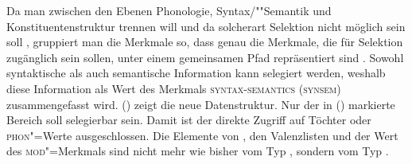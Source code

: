 Da man zwischen den Ebenen Phonologie, Syntax/""Semantik und Konstituentenstruktur trennen will
und da solcherart Selektion nicht möglich sein soll \citep[--144]{ps}, gruppiert man die Merkmale so,
dass genau die Merkmale, die für Selektion zugänglich sein sollen,
unter einem gemeinsamen Pfad repräsentiert sind \citep[]{ps2}.
Sowohl syntaktische als auch semantische Information kann selegiert werden, weshalb diese
Information als Wert des Merkmals \textsc{syntax-semantics} (\textsc{synsem}) zusammengefasst wird. ()
zeigt die neue Datenstruktur.
Nur der in () markierte Bereich soll selegierbar sein. Damit ist der direkte
Zugriff auf Töchter oder \textsc{phon}"=Werte ausgeschlossen. Die Elemente von \argst, den Valenzlisten
und der Wert des \textsc{mod}"=Merkmals sind nicht mehr wie bisher vom Typ , sondern vom Typ
.
\ea
{}
\z
%


